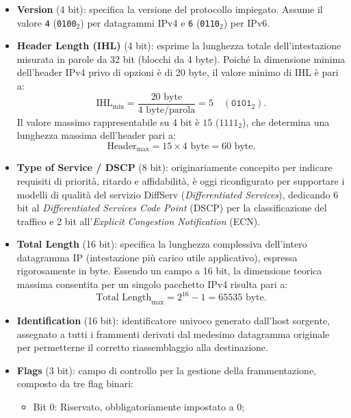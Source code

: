 \documentclass[11pt, a4paper]{article}
\begin{document}
\begin{itemize}
    \item \textbf{Version} (4 bit): specifica la versione del protocollo impiegato. Assume il valore \texttt{4} (\texttt{0100}$_2$) per datagrammi IPv4 e \texttt{6} (\texttt{0110}$_2$) per IPv6.
    \item \textbf{Header Length (IHL)} (4 bit): esprime la lunghezza totale dell'intestazione misurata in parole da 32 bit (blocchi da 4 byte). Poiché la dimensione minima dell'header IPv4 privo di opzioni è di 20 byte, il valore minimo di IHL è pari a:
    \begin{equation}
        \text{IHL}_{\min} = \frac{20\text{ byte}}{4\text{ byte/parola}} = 5 \quad (\texttt{0101}_2).
    \end{equation}
    Il valore massimo rappresentabile su 4 bit è $15$ ($1111_2$), che determina una lunghezza massima dell'header pari a:
    \begin{equation}
        \text{Header}_{\max} = 15 \times 4\text{ byte} = 60\text{ byte}.
    \end{equation}
    \item \textbf{Type of Service / DSCP} (8 bit): originariamente concepito per indicare requisiti di priorità, ritardo e affidabilità, è oggi riconfigurato per supportare i modelli di qualità del servizio DiffServ (\emph{Differentiated Services}), dedicando 6 bit al \emph{Differentiated Services Code Point} (DSCP) per la classificazione del traffico e 2 bit all'\emph{Explicit Congestion Notification} (ECN).
    \item \textbf{Total Length} (16 bit): specifica la lunghezza complessiva dell'intero datagramma IP (intestazione più carico utile applicativo), espressa rigorosamente in byte. Essendo un campo a 16 bit, la dimensione teorica massima consentita per un singolo pacchetto IPv4 risulta pari a:
    \begin{equation}
        \text{Total Length}_{\max} = 2^{16} - 1 = 65535\text{ byte}.
    \end{equation}
    \item \textbf{Identification} (16 bit): identificatore univoco generato dall'host sorgente, assegnato a tutti i frammenti derivati dal medesimo datagramma originale per permetterne il corretto riassemblaggio alla destinazione.
    \item \textbf{Flags} (3 bit): campo di controllo per la gestione della frammentazione, composto da tre flag binari:
    \begin{itemize}[noitemsep]
        \item Bit 0: Riservato, obbligatoriamente impostato a 0;

\end{itemize}
\end{itemize}
\end{document}
